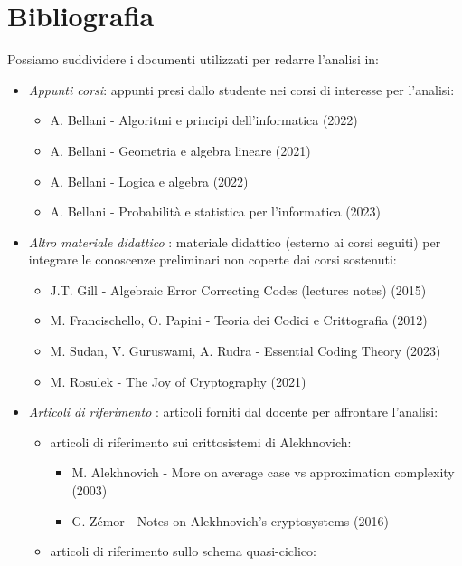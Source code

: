 \documentclass[12pt, a4paper]{report}
\theoremstyle{definition}
\begin{document}
	\chapter{Bibliografia}
		Possiamo suddividere i documenti utilizzati per redarre l'analisi in:
			\begin{itemize}
				\item \emph{Appunti corsi}: appunti presi dallo studente nei corsi di interesse per l'analisi:
					\begin{itemize}
						\item A. Bellani - Algoritmi e principi dell'informatica (2022)
						\item A. Bellani - Geometria e algebra lineare (2021)
						\item A. Bellani - Logica e algebra (2022)
						\item A. Bellani - Probabilità e statistica per l'informatica (2023)
					\end{itemize}
				\item \emph{Altro materiale didattico} : materiale didattico (esterno ai corsi seguiti) per integrare le conoscenze preliminari non coperte dai corsi sostenuti:
					\begin{itemize}
						\item J.T. Gill - Algebraic Error Correcting Codes (lectures notes) (2015)
						\item M. Francischello, O. Papini - Teoria dei Codici e Crittografia (2012)
						\item M. Sudan, V. Guruswami, A. Rudra - Essential Coding Theory (2023)
						\item M. Rosulek - The Joy of Cryptography (2021)
					\end{itemize}
				\item \emph{Articoli di riferimento} : articoli forniti dal docente per affrontare l'analisi:
					\begin{itemize}
						\item articoli di riferimento sui crittosistemi di Alekhnovich:
							\begin{itemize}
								\item M. Alekhnovich - More on average case vs approximation complexity (2003)
								\item G. Zémor - Notes on Alekhnovich’s cryptosystems (2016)
							\end{itemize}
						\item articoli di riferimento sullo schema quasi-ciclico:
							\begin{itemize}

\end{itemize}
\end{itemize}
\end{itemize}
\end{document}

